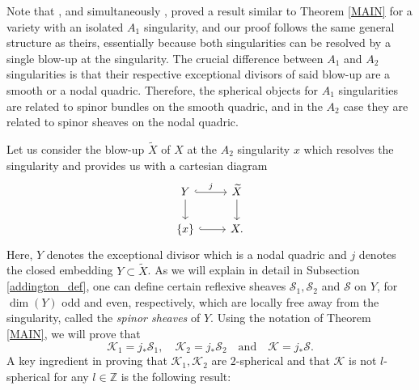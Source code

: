 \documentclass[a4paper, twoside, 11pt]{amsart}
\theoremstyle{definition}
\theoremstyle{remark}
\numberwithin{equation}{theorem}
\begin{document}
Note that \cite[Theorem 1.1]{Kernels_nodal}, and simultaneously \cite[Theorem 5.8]{categorical_absorptions}, proved a result similar to Theorem \ref{MAIN} for a variety with an isolated $A_1$ singularity, and our proof follows the same general structure as theirs, essentially because both singularities can be resolved by a single blow-up at the singularity. The crucial difference between $A_1$ and $A_2$ singularities is that their respective exceptional divisors of said blow-up are a smooth or a nodal quadric. Therefore, the spherical objects for $A_1$ singularities are related to spinor bundles on the smooth quadric, and in the $A_2$ case they are related to spinor sheaves on the nodal quadric.

Let us consider the blow-up $\widetilde{X}$ of $X$ at the $A_2$ singularity $x$ which resolves the singularity and provides us with a cartesian diagram 
\begin{equation*}
		\begin{tikzcd}
			Y \arrow[d] \arrow[r, "j", hook] & \widetilde{X} \arrow[d] \\
			\{x\} \arrow[r, hook]            & X.                     
		\end{tikzcd}
	\end{equation*}
Here, $Y$ denotes the exceptional divisor which is a nodal quadric and $j$ denotes the closed embedding $ Y \subset \widetilde{X}$. As we will explain in detail in Subsection \ref{addington_def}, one can define certain reflexive sheaves $\mathcal{S}_1, \mathcal{S}_2$ and $\mathcal{S}$ on $Y$, for $\dim(Y)$ odd and even, respectively, which are locally free away from the singularity, called the \textit{spinor sheaves} of $Y$. Using the notation of Theorem \ref{MAIN}, we will prove that 
\begin{equation*}
    \mathcal{K}_1 = j_*\mathcal{S}_1,  \quad \mathcal{K}_2 = j_*\mathcal{S}_2 \quad \text{and} \quad \mathcal{K} = j_*\mathcal{S}.
\end{equation*}
A key ingredient in proving that $\mathcal{K}_1, \mathcal{K}_2$ are $2$-spherical and that $\mathcal{K}$ is not $l$-spherical for any $l\in \mathbb{Z}$ is the following result:
\end{document}

